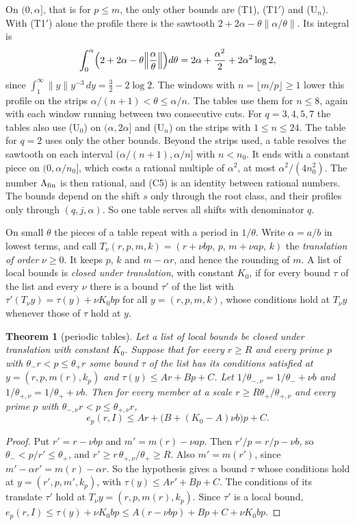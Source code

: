 \documentclass[11pt]{amsart}
\newtheorem{theorem}{Theorem}[section]
\theoremstyle{definition}
\theoremstyle{remark}
\numberwithin{equation}{section}
\begin{document}
On $(0,\alpha]$, that is for $p\le m$, the only other bounds are (T1), (T1$'$) and (U$_n$). With (T1$'$) alone the
profile there is the sawtooth $2+2\alpha-\theta\|\alpha/\theta\|$. Its integral is
\[
 \int_0^\alpha\Bigl(2+2\alpha-\theta\Bigl\|\frac\alpha\theta\Bigr\|\Bigr)d\theta=2\alpha+\frac{\alpha^2}2+2\alpha^2\log2,
\]
since $\int_1^\infty\|y\|y^{-3}\,dy=\frac32-2\log2$. The windows with $n=\lfloor m/p\rfloor\ge1$ lower this profile on the
strips $\alpha/(n+1)<\theta\le\alpha/n$. The tables use them for $n\le8$, again with each window running between two
consecutive cuts. For $q=3,4,5,7$ the tables also use (U$_0$) on $(\alpha,2\alpha]$ and (U$_n$) on the strips with
$1\le n\le24$. The table for $q=2$ uses only the other bounds. Beyond the strips used, a table resolves the sawtooth on each
interval $(\alpha/(n+1),\alpha/n]$ with $n<n_0$. It ends with a constant piece on $(0,\alpha/n_0]$, which costs a rational multiple of $\alpha^2$, at
most $\alpha^2/(4n_0^2)$. The number $\Lambda_{\rm fin}$ is then rational, and (C5) is an identity between rational numbers.
The bounds depend on the shift $s$ only through the root class, and their profiles only through $(q,j,\alpha)$. So one
table serves all shifts with denominator $q$.

On small $\theta$ the pieces of a table repeat with a period in $1/\theta$. Write $\alpha=a/b$ in lowest terms, and
call $T_\nu(r,p,m,k)=(r+\nu bp,\,p,\,m+\nu ap,\,k)$ the \emph{translation of order} $\nu\ge0$. It keeps $p$, $k$ and $m-\alpha r$, and hence the rounding of $m$. A list of local bounds is \emph{closed
under translation}, with constant $K_0$, if for every bound $\tau$ of the list and every $\nu$ there is a bound $\tau'$
of the list with $\tau'(T_\nu y)=\tau(y)+\nu K_0bp$ for all $y=(r,p,m,k)$, whose
conditions hold at $T_\nu y$ whenever those of $\tau$ hold at $y$.

\begin{theorem}[periodic tables]\label{thm:periodic}
Let a list of local bounds be closed under translation with constant $K_0$. Suppose that for every $r\ge R$ and every
prime $p$ with $\theta_-r<p\le\theta_+r$ some bound $\tau$ of the list has its conditions satisfied at
$y=(r,p,m(r),k_p)$ and $\tau(y)\le Ar+Bp+C$. Let $1/\theta_{-,\nu}=1/\theta_-+\nu b$ and $1/\theta_{+,\nu}=1/\theta_++\nu b$.
Then for every member at a scale $r\ge R\theta_+/\theta_{+,\nu}$ and every prime $p$ with $\theta_{-,\nu}r<p\le\theta_{+,\nu}r$,
\[
 e_p(r,I)\le Ar+\bigl(B+(K_0-A)\nu b\bigr)p+C .
\]
\end{theorem}
\begin{proof}
Put $r'=r-\nu bp$ and $m'=m(r)-\nu ap$. Then $r'/p=r/p-\nu b$, so $\theta_-<p/r'\le\theta_+$,
and $r'\ge r\,\theta_{+,\nu}/\theta_+\ge R$. Also $m'=m(r')$, since $m'-\alpha r'=m(r)-\alpha r$. So the hypothesis
gives a bound $\tau$ whose conditions hold at $y=(r',p,m',k_p)$, with $\tau(y)\le Ar'+Bp+C$. The conditions of its
translate $\tau'$ hold at $T_\nu y=(r,p,m(r),k_p)$. Since $\tau'$ is a local
bound, $e_p(r,I)\le\tau(y)+\nu K_0bp\le A(r-\nu bp)+Bp+C+\nu K_0bp$.
\end{proof}
\end{document}
